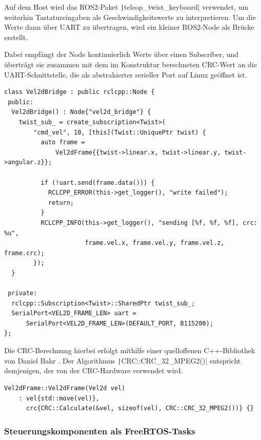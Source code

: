 Auf dem Host wird das ROS2-Paket \texttt|teleop_twist_keyboard|
verwendet, um weiterhin Tastatureingaben als Geschwindigkeitswerte zu
interpretieren. Um die Werte dann über UART zu übertragen, wird ein kleiner
ROS2-Node als Brücke erstellt.

Dabei empfängt der Node kontinuierlich Werte über einen Subscriber, und
überträgt sie zusammen mit dem im Konstruktur berechneten CRC-Wert an die
UART-Schnittstelle, die als abstrahierter serieller Port auf Linux geöffnet ist.

\begin{code}
\begin{verbatim}
class Vel2dBridge : public rclcpp::Node {
 public:
  Vel2dBridge() : Node{"vel2d_bridge"} {
    twist_sub_ = create_subscription<Twist>(
        "cmd_vel", 10, [this](Twist::UniquePtr twist) {
          auto frame =
              Vel2dFrame{{twist->linear.x, twist->linear.y, twist->angular.z}};

          if (!uart.send(frame.data())) {
            RCLCPP_ERROR(this->get_logger(), "write failed");
            return;
          }
          RCLCPP_INFO(this->get_logger(), "sending [%f, %f, %f], crc: %u",
                      frame.vel.x, frame.vel.y, frame.vel.z, frame.crc);
        });
  }

 private:
  rclcpp::Subscription<Twist>::SharedPtr twist_sub_;
  SerialPort<VEL2D_FRAME_LEN> uart =
      SerialPort<VEL2D_FRAME_LEN>(DEFAULT_PORT, B115200);
};
\end{verbatim}
\end{code}

Die CRC-Berechnung hierbei erfolgt mithilfe einer quelloffenen C++-Bibliothek
von Daniel Bahr \cite{CRCpp}. Der Algorithmus
\texttt|CRC::CRC_32_MPEG2()| entspricht demjenigen, der von der
CRC-Hardware verwendet wird.

\begin{code}
\begin{verbatim}
Vel2dFrame::Vel2dFrame(Vel2d vel)
    : vel{std::move(vel)},
      crc{CRC::Calculate(&vel, sizeof(vel), CRC::CRC_32_MPEG2())} {}
\end{verbatim}
\end{code}

\subsubsection{Steuerungskomponenten als FreeRTOS-Tasks}

